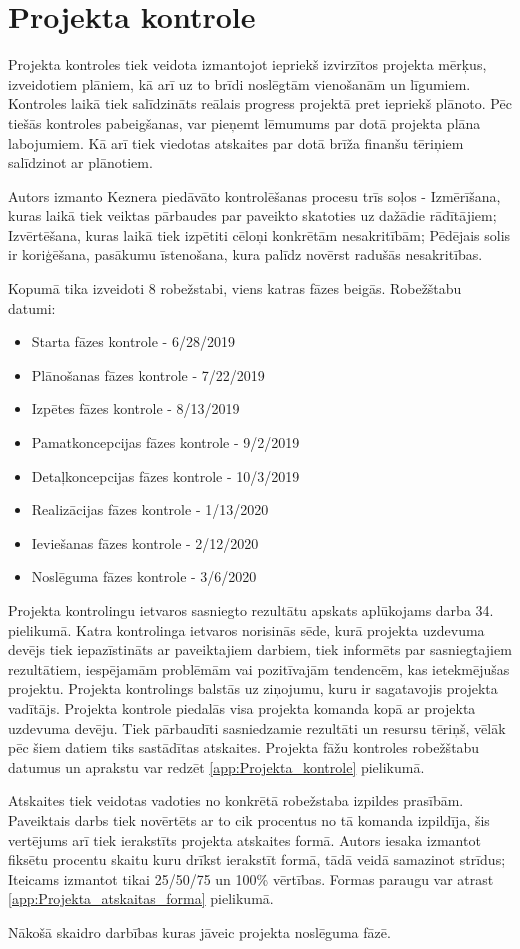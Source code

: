 \section{Projekta kontrole}
Projekta kontroles tiek veidota izmantojot iepriekš izvirzītos projekta mērķus, 
izveidotiem plāniem, kā arī uz to brīdi noslēgtām vienošanām un līgumiem. Kontroles
laikā tiek salīdzināts reālais progress projektā pret iepriekš plānoto. Pēc 
tiešās kontroles pabeigšanas, var pieņemt lēmumums par dotā projekta plāna labojumiem.
Kā arī tiek viedotas atskaites par dotā brīža finanšu tēriņiem salīdzinot ar plānotiem.
\par
Autors izmanto Keznera piedāvāto kontrolēšanas procesu trīs soļos - Izmērīšana, kuras laikā tiek
veiktas pārbaudes par paveikto skatoties uz dažādie rādītājiem; Izvērtēšana, kuras laikā tiek
izpētiti cēloņi konkrētām nesakritībām; Pēdējais solis ir koriģēšana, pasākumu īstenošana, 
kura palīdz novērst radušās nesakritības.
\par
Kopumā tika izveidoti 8 robežstabi, viens katras fāzes beigās. Robežštabu datumi:
\begin{itemize}
  \item Starta fāzes kontrole -	6/28/2019
  \item Plānošanas fāzes kontrole -	7/22/2019
  \item Izpētes fāzes kontrole -	8/13/2019
  \item Pamatkoncepcijas fāzes kontrole -	9/2/2019
  \item Detaļkoncepcijas fāzes kontrole -	10/3/2019
  \item Realizācijas fāzes kontrole -	1/13/2020
  \item Ieviešanas fāzes kontrole -	2/12/2020
  \item Noslēguma fāzes kontrole -	3/6/2020
\end{itemize}
\par
Projekta kontrolingu ietvaros sasniegto rezultātu apskats aplūkojams darba 34. pielikumā.
Katra kontrolinga ietvaros norisinās sēde, kurā projekta uzdevuma devējs tiek iepazīstināts ar
paveiktajiem darbiem, tiek informēts par sasniegtajiem rezultātiem, iespējamām problēmām vai
pozitīvajām tendencēm, kas ietekmējušas projektu. Projekta kontrolings balstās uz ziņojumu, kuru
ir sagatavojis projekta vadītājs.
Projekta kontrole piedalās visa projekta komanda kopā ar projekta uzdevuma devēju. Tiek pārbaudīti
sasniedzamie rezultāti un resursu tēriņš, vēlāk pēc šiem datiem tiks sastādītas atskaites.
Projekta fāžu kontroles robežštabu datumus un aprakstu var redzēt \ref{app:Projekta_kontrole} pielikumā.
\par
Atskaites tiek veidotas vadoties no konkrētā robežstaba izpildes prasībām. Paveiktais darbs tiek novērtēts
ar to cik procentus no tā komanda izpildīja, šis vertējums arī tiek ierakstīts projekta atskaites formā.
Autors iesaka izmantot fiksētu procentu skaitu kuru drīkst ierakstīt formā, tādā veidā samazinot strīdus;
Iteicams izmantot tikai 25/50/75 un 100\% vērtības. Formas paraugu var atrast 
\ref{app:Projekta_atskaitas_forma} pielikumā.
\par
Nākošā skaidro darbības kuras jāveic projekta noslēguma fāzē.